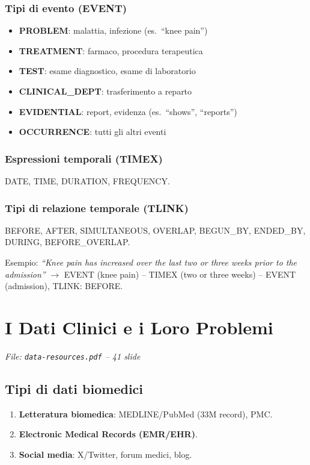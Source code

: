 \documentclass[a4paper,12pt]{article}
\begin{document}
\subsubsection{Tipi di evento (EVENT)}
\begin{itemize}
    \item \textbf{PROBLEM}: malattia, infezione (es.\ ``knee pain'')
    \item \textbf{TREATMENT}: farmaco, procedura terapeutica
    \item \textbf{TEST}: esame diagnostico, esame di laboratorio
    \item \textbf{CLINICAL\_DEPT}: trasferimento a reparto
    \item \textbf{EVIDENTIAL}: report, evidenza (es.\ ``shows'', ``reports'')
    \item \textbf{OCCURRENCE}: tutti gli altri eventi
\end{itemize}

\subsubsection{Espressioni temporali (TIMEX)}
DATE, TIME, DURATION, FREQUENCY.

\subsubsection{Tipi di relazione temporale (TLINK)}
BEFORE, AFTER, SIMULTANEOUS, OVERLAP, BEGUN\_BY, ENDED\_BY, DURING, BEFORE\_OVERLAP.

Esempio: \textit{``Knee pain has increased over the last two or three weeks prior to the admission''} $\to$ EVENT (knee pain) -- TIMEX (two or three weeks) -- EVENT (admission), TLINK: BEFORE.

\section{I Dati Clinici e i Loro Problemi}
\textit{File: \texttt{data-resources.pdf} -- 41 slide}

\subsection{Tipi di dati biomedici}
\begin{enumerate}
    \item \textbf{Letteratura biomedica}: MEDLINE/PubMed (33M record), PMC.
    \item \textbf{Electronic Medical Records (EMR/EHR)}.
    \item \textbf{Social media}: X/Twitter, forum medici, blog.
\end{enumerate}
\end{document}
